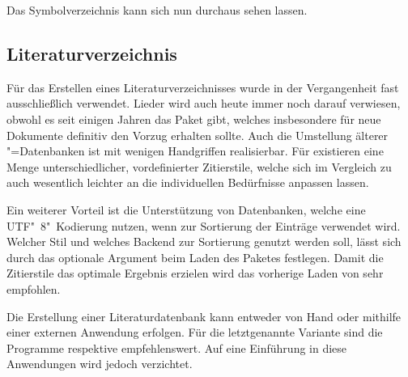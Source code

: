 \documentclass[%
  english,ngerman,%
  geometry=no,DIV=12,automark,%
]{tudscrartcl}
\begin{document}
%
Das Symbolverzeichnis kann sich nun durchaus sehen lassen.
%
\begin{Hint}
\printsymbols[style=symblongtabu]
\end{Hint}
\begin{quoting}[rightmargin=0pt]
\printsymbols[style=symbtabu]
\end{quoting}


\subsection{Literaturverzeichnis}
\label{sec:biblatex}
Für das Erstellen eines Literaturverzeichnisses wurde in der Vergangenheit fast 
ausschließlich  verwendet. Lieder wird auch heute immer noch 
darauf verwiesen, obwohl es seit einigen Jahren das Paket  
gibt, welches insbesondere für neue Dokumente definitiv den Vorzug erhalten 
sollte. Auch die Umstellung älterer "=Datenbanken ist mit 
wenigen Handgriffen realisierbar. Für  existieren eine Menge 
unterschiedlicher, vordefinierter Zitierstile, welche sich im Vergleich zu 
 auch wesentlich leichter an die individuellen Bedürfnisse 
anpassen lassen.

Ein weiterer Vorteil ist die Unterstützung von Datenbanken, welche eine 
UTF"~8"~Kodierung nutzen, wenn  zur Sortierung der Einträge 
verwendet wird. Welcher Stil und welches Backend zur Sortierung genutzt werden 
soll, lässt sich durch das optionale Argument beim Laden des Paketes festlegen. 
Damit die Zitierstile das optimale Ergebnis erzielen wird das vorherige Laden 
von  sehr empfohlen.
%
\begin{Preamble}
\usepackage{csquotes}
\usepackage[backend=biber,style=alphabetic]{biblatex}

\end{Preamble}
%
Die Erstellung einer Literaturdatenbank kann entweder von Hand oder mithilfe 
einer externen Anwendung erfolgen. Für die letztgenannte Variante sind die 
Programme  respektive  empfehlenswert. 
Auf eine Einführung in diese Anwendungen wird jedoch verzichtet. 
\end{document}
